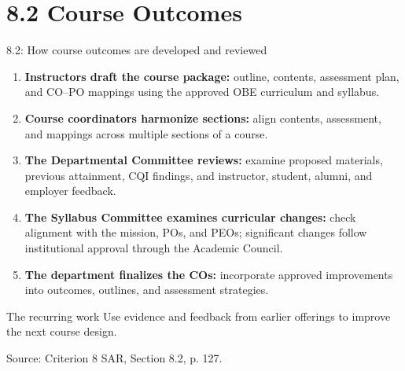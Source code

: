 \documentclass[aspectratio=169,11pt]{beamer}
\newcommand{\source}[1]{\par\vfill{\tiny\color{gray}Source: Criterion 8 SAR, #1.}}
\begin{document}
\section{8.2 Course Outcomes}
\begin{frame}{8.2: How course outcomes are developed and reviewed}
\small
\begin{enumerate}
\item \textbf{Instructors draft the course package:} outline, contents, assessment plan, and CO--PO mappings using the approved OBE curriculum and syllabus.
\item \textbf{Course coordinators harmonize sections:} align contents, assessment, and mappings across multiple sections of a course.
\item \textbf{The Departmental Committee reviews:} examine proposed materials, previous attainment, CQI findings, and instructor, student, alumni, and employer feedback.
\item \textbf{The Syllabus Committee examines curricular changes:} check alignment with the mission, POs, and PEOs; significant changes follow institutional approval through the Academic Council.
\item \textbf{The department finalizes the COs:} incorporate approved improvements into outcomes, outlines, and assessment strategies.
\end{enumerate}
\begin{exampleblock}{The recurring work}
Use evidence and feedback from earlier offerings to improve the next course design.
\end{exampleblock}
\source{Section 8.2, p. 127}
\end{frame}
\end{document}
